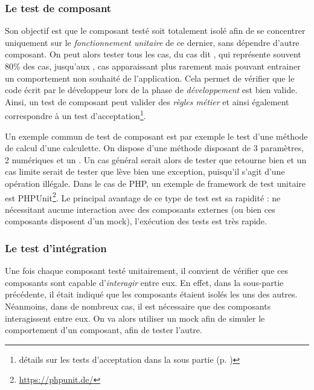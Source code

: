 \subsubsection{Le test de composant}\label{test-composant}

Son objectif est que le composant testé soit totalement isolé afin de se concentrer uniquement sur le \emph{fonctionnement unitaire} de ce dernier, sans dépendre d'autre composant. On peut alors tester tous les cas, du cas dit , qui représente souvent 80\% des cas, jusqu'aux , cas apparaissant plus rarement mais pouvant entrainer un comportement non souhaité de l'application. Cela permet de vérifier que le code écrit par le développeur lors de la phase de \emph{développement} est bien valide. Ainsi, un test de composant peut valider des \emph{règles métier} et ainsi également correspondre à un test d'acceptation\footnote{détails sur les tests d'acceptation dans la sous partie  (p. \pageref{test-acceptation})}.

Un exemple commun de test de composant est par exemple le test d'une méthode de calcul d'une calculette. On dispose d'une méthode  disposant de 3 paramètres, 2  numériques et un . Un cas général serait alors de tester que  retourne bien  et un cas limite serait de tester que  lève bien une exception, puisqu'il s'agit d'une opération illégale. Dans le cas de \gls{PHP}, un exemple de \gls{framework} de test unitaire est PHPUnit\footnote{\url{https://phpunit.de/}}. Le principal avantage de ce type de test est sa rapidité : ne nécessitant aucune interaction avec des composants externes (ou bien ces composants disposent d'un \gls{mock}), l'exécution des tests est très rapide.

\subsubsection{Le test d'intégration}

Une fois chaque composant testé unitairement, il convient de vérifier que ces composants sont capable d'\emph{interagir} entre eux. En effet, dans la sous-partie précédente, il était indiqué que les composants étaient isolés les uns des autres. Néanmoins, dans de nombreux cas, il est nécessaire que des composants interagissent entre eux. On va alors utiliser un \gls{mock} afin de simuler le comportement d'un composant, afin de tester l'autre.

